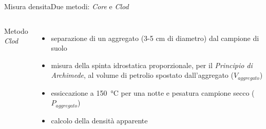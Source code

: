 \documentclass[10pt]{beamer}
\begin{document}
\begin{frame}{Misura densita}{Due metodi: \emph{Core} e \emph{Clod}}

  \begin{columns}[c]
     Metodo \emph{Clod}
    \pause
    \begin{itemize}[<+->]
    \item separazione di un aggregato (3-5 cm di diametro) dal
      campione di suolo
    \item misura della spinta idrostatica proporzionale, per il
      \emph{Principio di Archimede}, al volume di petrolio spostato
      dall'aggregato ($V_{aggregato}$)
    \item essiccazione a \SI{150}{\celsius} per una notte e pesatura campione
      secco ($P_{aggregato}$)
    \item calcolo della densit\`a apparente
    \end{itemize}

\end{columns}
\end{frame}
\end{document}
